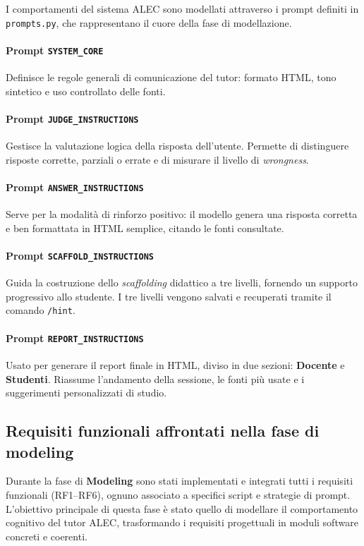 \documentclass[a4paper,9pt]{article}
\begin{document}
I comportamenti del sistema ALEC sono modellati attraverso i prompt definiti in \texttt{prompts.py}, che rappresentano il cuore della fase di modellazione.

\paragraph{Prompt \texttt{SYSTEM\_CORE}}
Definisce le regole generali di comunicazione del tutor: formato HTML, tono sintetico e uso controllato delle fonti.

\paragraph{Prompt \texttt{JUDGE\_INSTRUCTIONS}}
Gestisce la valutazione logica della risposta dell'utente. 
Permette di distinguere risposte corrette, parziali o errate e di misurare il livello di \textit{wrongness}.

\paragraph{Prompt \texttt{ANSWER\_INSTRUCTIONS}}
Serve per la modalità di rinforzo positivo: il modello genera una risposta corretta e ben formattata in HTML semplice, citando le fonti consultate.

\paragraph{Prompt \texttt{SCAFFOLD\_INSTRUCTIONS}}
Guida la costruzione dello \textit{scaffolding} didattico a tre livelli, fornendo un supporto progressivo allo studente. 
I tre livelli vengono salvati e recuperati tramite il comando \texttt{/hint}.

\paragraph{Prompt \texttt{REPORT\_INSTRUCTIONS}}
Usato per generare il report finale in HTML, diviso in due sezioni: \textbf{Docente} e \textbf{Studenti}. 
Riassume l'andamento della sessione, le fonti più usate e i suggerimenti personalizzati di studio.

\subsection{Requisiti funzionali affrontati nella fase di modeling}

Durante la fase di \textbf{Modeling} sono stati implementati e integrati tutti i requisiti funzionali (RF1–RF6), ognuno associato a specifici script e strategie di prompt. 
L’obiettivo principale di questa fase è stato quello di modellare il comportamento cognitivo del tutor ALEC, trasformando i requisiti progettuali in moduli software concreti e coerenti.
\end{document}
